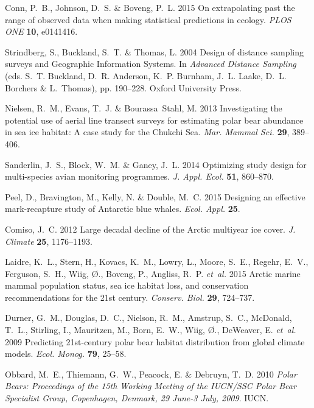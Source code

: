 \documentclass[]{rsos}%
\begin{document}
\begin{thebibliography}{10}
Conn, P.~B., Johnson, D.~S. \& Boveng, P.~L. 2015 On extrapolating past the
  range of observed data when making statistical predictions in ecology.
 \emph{PLOS ONE} \textbf{10}, e0141416.

Strindberg, S., Buckland, S.~T. \& Thomas, L. 2004 Design of distance sampling
  surveys and {G}eographic {I}nformation {S}ystems.
 In \emph{Advanced Distance Sampling} (eds. S.~T. Buckland, D.~R.
  Anderson, K.~P. Burnham, J.~L. Laake, D.~L. Borchers \& L.~Thomas), pp.
  190--228. Oxford University Press.

Nielsen, R.~M., Evans, T.~J. \& Bourassa~Stahl, M. 2013 Investigating the
  potential use of aerial line transect surveys for estimating polar bear
  abundance in sea ice habitat: A case study for the {C}hukchi {S}ea.
 \emph{Mar. Mammal Sci.} \textbf{29}, 389--406.

Sanderlin, J.~S., Block, W.~M. \& Ganey, J.~L. 2014 Optimizing study design
  for multi-species avian monitoring programmes.
 \emph{J. Appl. Ecol.} \textbf{51}, 860--870.

Peel, D., Bravington, M., Kelly, N. \& Double, M.~C. 2015 Designing an
  effective mark-recapture study of {A}ntarctic blue whales.
 \emph{Ecol. Appl.} \textbf{25}.

Comiso, J.~C. 2012 Large decadal decline of the {A}rctic multiyear ice cover.
 \emph{J. Climate} \textbf{25}, 1176--1193.

Laidre, K.~L., Stern, H., Kovacs, K.~M., Lowry, L., Moore, S.~E., Regehr,
  E.~V., Ferguson, S.~H., Wiig, {\O}., Boveng, P., Angliss, R.~P.
  \emph{et~al.} 2015 Arctic marine mammal population status, sea ice habitat
  loss, and conservation recommendations for the 21st century.
 \emph{Conserv. Biol.} \textbf{29}, 724--737.

Durner, G.~M., Douglas, D.~C., Nielson, R.~M., Amstrup, S.~C., McDonald, T.~L.,
  Stirling, I., Mauritzen, M., Born, E.~W., Wiig, {\O}., DeWeaver, E.
  \emph{et~al.} 2009 Predicting 21st-century polar bear habitat distribution
  from global climate models.
 \emph{Ecol. Monog.} \textbf{79}, 25--58.

Obbard, M.~E., Thiemann, G.~W., Peacock, E. \& Debruyn, T.~D. 2010 \emph{Polar
  Bears: Proceedings of the 15th Working Meeting of the IUCN/SSC Polar Bear
  Specialist Group, Copenhagen, Denmark, 29 June-3 July, 2009}.
 IUCN.


\end{thebibliography}
\end{document}
